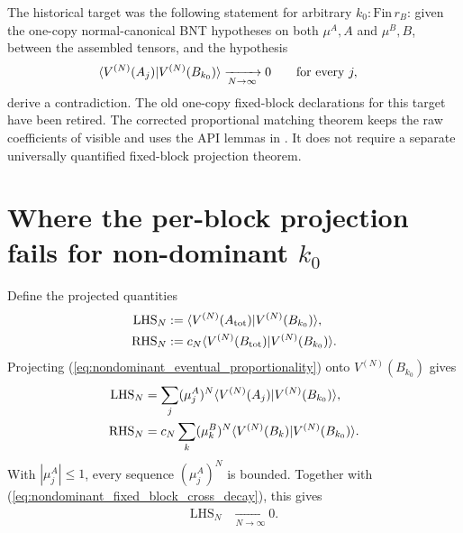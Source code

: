 \documentclass{article}
\begin{document}
The historical target was the following statement for arbitrary
$k_0:\mathrm{Fin}\,r_B$: given the one-copy normal-canonical BNT hypotheses on
both $\mu^A,A$ and $\mu^B,B$,
 between the
assembled tensors, and the hypothesis
\begin{align}
    \langle V^{(N)}(A_j) | V^{(N)}(B_{k_0}) \rangle
        &\xrightarrow[N\to\infty]{}0
        \qquad\text{for every }j,
    \label{eq:nondominant_retired_target_decay}
\end{align}
derive a contradiction. The old one-copy fixed-block declarations for this
target have been retired. The corrected  proportional
matching theorem keeps the raw coefficients of 
visible and uses the API lemmas in
. It does not require a
separate universally quantified fixed-block projection theorem.

\section{Where the per-block projection fails for non-dominant
\texorpdfstring{$k_0$}{k0}}

Define the projected quantities
\begin{align}
    \mathrm{LHS}_N
        &:=\langle V^{(N)}(A_{\mathrm{tot}}) | V^{(N)}(B_{k_0}) \rangle,
    \label{eq:nondominant_projected_lhs_definition}\\
    \mathrm{RHS}_N
        &:=c_N\langle V^{(N)}(B_{\mathrm{tot}}) | V^{(N)}(B_{k_0}) \rangle.
    \label{eq:nondominant_projected_rhs_definition}
\end{align}
Projecting (\ref{eq:nondominant_eventual_proportionality}) onto
$V^{(N)}(B_{k_0})$ gives
\begin{align}
    \mathrm{LHS}_N
        &=\sum_j(\mu^A_j)^N
          \langle V^{(N)}(A_j) | V^{(N)}(B_{k_0}) \rangle,
    \label{eq:nondominant_projected_lhs_expansion}\\
    \mathrm{RHS}_N
        &=c_N\sum_k(\mu^B_k)^N
          \langle V^{(N)}(B_k) | V^{(N)}(B_{k_0}) \rangle.
    \label{eq:nondominant_projected_rhs_expansion}
\end{align}
With $|\mu^A_j|\leq 1$, every sequence $(\mu^A_j)^N$ is bounded. Together
with (\ref{eq:nondominant_fixed_block_cross_decay}), this gives
\begin{align}
    \mathrm{LHS}_N
        &\xrightarrow[N\to\infty]{}0.
    \label{eq:nondominant_projected_lhs_decay}
\end{align}
\end{document}
